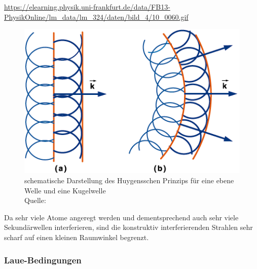 		\url{https://elearning.physik.uni-frankfurt.de/data/FB13-PhysikOnline/lm_data/lm_324/daten/bild_4/10_0060.gif}
		\begin{figure}[htb]
			\centering
			\includegraphics[scale=0.5]{images/wellenfront.png}
			\caption{schematische Darstellung des Huygensschen Prinzips für eine ebene Welle und eine Kugelwelle \\ Quelle: }
			\label{fig:wellenfront}
		\end{figure}

		Da sehr viele Atome angeregt werden und dementsprechend auch sehr viele Sekundärwellen interferieren, sind die konstruktiv interferierenden Strahlen sehr scharf auf einen kleinen Raumwinkel begrenzt.

		\subsubsection{Laue-Bedingungen}
		\label{sssec:laue-bedingungen}

